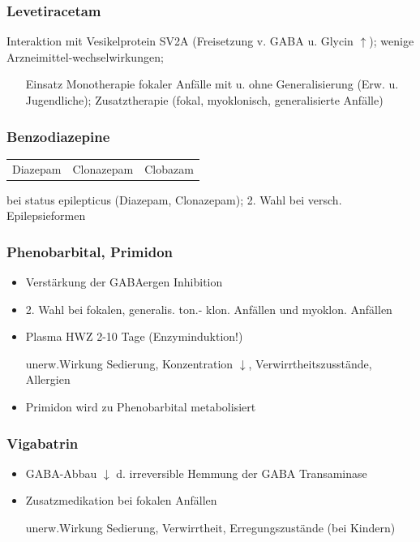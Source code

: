 \documentclass[10pt,a4paper]{report}
\begin{document}
\subsubsection{Levetiracetam} %
\label{ssub:levetiracetam}
Interaktion mit Vesikelprotein SV2A (Freisetzung v. GABA u. Glycin $\uparrow$); wenige Arzneimittel-wechselwirkungen; 
\begin{itemize}
	\item[Einsatz] Monotherapie fokaler Anfälle mit u. ohne Generalisierung (Erw. u. Jugendliche); Zusatztherapie (fokal, myoklonisch, generalisierte Anfälle)
\end{itemize}
\subsubsection{Benzodiazepine} %
\label{ssub:benzodiazepine}
\begin{tabularx}{\textwidth}{XXX}
Diazepam&Clonazepam&Clobazam\\ 
\end{tabularx}
bei status epilepticus (Diazepam, Clonazepam); 2. Wahl bei versch. Epilepsieformen
\subsubsection{Phenobarbital, Primidon} %
\label{ssub:phenobarbital_primidon}
\begin{itemize}
	\item Verstärkung der GABAergen Inhibition
	\item 2. Wahl bei fokalen, generalis. ton.- klon. Anfällen und myoklon. Anfällen
	\item Plasma HWZ 2-10 Tage (Enzyminduktion!)
	\item[unerw.Wirkung] Sedierung, Konzentration $\downarrow$, Verwirrtheitszusstände, Allergien 
	\item Primidon wird zu Phenobarbital metabolisiert
\end{itemize}
\subsubsection{Vigabatrin} %
\label{ssub:vigabatrin}
\begin{itemize}
	\item GABA-Abbau $\downarrow$ d. irreversible Hemmung der GABA Transaminase
	\item Zusatzmedikation bei fokalen Anfällen
	\item[unerw.Wirkung] Sedierung, Verwirrtheit, Erregungszustände (bei Kindern)
\end{itemize}
\end{document}
